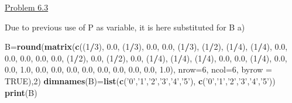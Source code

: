 \documentclass[]{article}
\newenvironment{Shaded}{\begin{snugshade}}{\end{snugshade}}
\newcommand{\DataTypeTok}[1]{\textcolor[rgb]{0.13,0.29,0.53}{#1}}
\newcommand{\DecValTok}[1]{\textcolor[rgb]{0.00,0.00,0.81}{#1}}
\newcommand{\FloatTok}[1]{\textcolor[rgb]{0.00,0.00,0.81}{#1}}
\newcommand{\KeywordTok}[1]{\textcolor[rgb]{0.13,0.29,0.53}{\textbf{#1}}}
\newcommand{\NormalTok}[1]{#1}
\newcommand{\OperatorTok}[1]{\textcolor[rgb]{0.81,0.36,0.00}{\textbf{#1}}}
\newcommand{\OtherTok}[1]{\textcolor[rgb]{0.56,0.35,0.01}{#1}}
\newcommand{\StringTok}[1]{\textcolor[rgb]{0.31,0.60,0.02}{#1}}
\begin{document}
\underline{Problem 6.3}

Due to previous use of P as variable, it is here substituted for B a)

\begin{Shaded}
\begin{Highlighting}[]
\NormalTok{B=}\KeywordTok{round}\NormalTok{(}\KeywordTok{matrix}\NormalTok{(}\KeywordTok{c}\NormalTok{((}\DecValTok{1}\OperatorTok{/}\DecValTok{3}\NormalTok{), }\FloatTok{0.0}\NormalTok{, (}\DecValTok{1}\OperatorTok{/}\DecValTok{3}\NormalTok{), }\FloatTok{0.0}\NormalTok{, }\FloatTok{0.0}\NormalTok{, (}\DecValTok{1}\OperatorTok{/}\DecValTok{3}\NormalTok{), }
\NormalTok{           (}\DecValTok{1}\OperatorTok{/}\DecValTok{2}\NormalTok{), (}\DecValTok{1}\OperatorTok{/}\DecValTok{4}\NormalTok{), (}\DecValTok{1}\OperatorTok{/}\DecValTok{4}\NormalTok{), }\FloatTok{0.0}\NormalTok{, }\FloatTok{0.0}\NormalTok{, }\FloatTok{0.0}\NormalTok{, }
           \FloatTok{0.0}\NormalTok{, }\FloatTok{0.0}\NormalTok{, (}\DecValTok{1}\OperatorTok{/}\DecValTok{2}\NormalTok{), }\FloatTok{0.0}\NormalTok{, (}\DecValTok{1}\OperatorTok{/}\DecValTok{2}\NormalTok{), }\FloatTok{0.0}\NormalTok{,}
\NormalTok{           (}\DecValTok{1}\OperatorTok{/}\DecValTok{4}\NormalTok{), (}\DecValTok{1}\OperatorTok{/}\DecValTok{4}\NormalTok{), (}\DecValTok{1}\OperatorTok{/}\DecValTok{4}\NormalTok{), }\FloatTok{0.0}\NormalTok{, }\FloatTok{0.0}\NormalTok{, (}\DecValTok{1}\OperatorTok{/}\DecValTok{4}\NormalTok{),}
           \FloatTok{0.0}\NormalTok{, }\FloatTok{0.0}\NormalTok{, }\FloatTok{1.0}\NormalTok{, }\FloatTok{0.0}\NormalTok{, }\FloatTok{0.0}\NormalTok{, }\FloatTok{0.0}\NormalTok{, }
           \FloatTok{0.0}\NormalTok{, }\FloatTok{0.0}\NormalTok{, }\FloatTok{0.0}\NormalTok{, }\FloatTok{0.0}\NormalTok{, }\FloatTok{0.0}\NormalTok{, }\FloatTok{1.0}\NormalTok{), }\DataTypeTok{nrow=}\DecValTok{6}\NormalTok{, }\DataTypeTok{ncol=}\DecValTok{6}\NormalTok{, }\DataTypeTok{byrow =} \OtherTok{TRUE}\NormalTok{),}\DecValTok{2}\NormalTok{)}
\KeywordTok{dimnames}\NormalTok{(B)=}\KeywordTok{list}\NormalTok{(}\KeywordTok{c}\NormalTok{(}\StringTok{'0'}\NormalTok{,}\StringTok{'1'}\NormalTok{,}\StringTok{'2'}\NormalTok{,}\StringTok{'3'}\NormalTok{,}\StringTok{'4'}\NormalTok{,}\StringTok{'5'}\NormalTok{), }\KeywordTok{c}\NormalTok{(}\StringTok{'0'}\NormalTok{,}\StringTok{'1'}\NormalTok{,}\StringTok{'2'}\NormalTok{,}\StringTok{'3'}\NormalTok{,}\StringTok{'4'}\NormalTok{,}\StringTok{'5'}\NormalTok{))}
\KeywordTok{print}\NormalTok{(B)}
\end{Highlighting}
\end{Shaded}
\end{document}
